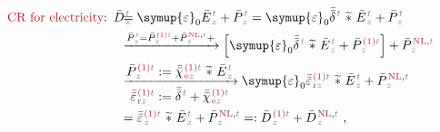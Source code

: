 \begin{subequations} \label{eq:cr-d}
\begin{align}
	\textcolor{Maroon}{\text{CR for electricity}}\text{:}&\hspace{0.5em} \bar{D}^{\;\!\textcolor{gray}{t}}_{\;\!\textcolor{gray}{z}} \hspace{-2.0em} &&= {\symup{\varepsilon}}_0 \bar{E}^{\;\!\textcolor{gray}{t}}_{\;\!\textcolor{gray}{z}} + \bar{P}^{\;\!\textcolor{gray}{t}}_{\;\!\textcolor{gray}{z}} = {\symup{\varepsilon}}_0 \bar{\bar{\delta}}^{\;\!\textcolor{gray}{t}}~\widetilde *~\bar{E}^{\;\!\textcolor{gray}{t}}_{\;\!\textcolor{gray}{z}} + \bar{P}^{\;\!\textcolor{gray}{t}}_{\;\!\textcolor{gray}{z}} \label{cr-d1} \\ & &&\xrightarrow[]{\bar{P}^{\;\!\textcolor{gray}{t}}_{\;\!\textcolor{gray}{z}} = \bar{P}^{\;\!\textcolor{Maroon}{\text{(1)}} \textcolor{gray}{t}}_{\;\!\textcolor{gray}{z}} + \bar{P}^{\;\!\textcolor{Maroon}{\text{NL}}, \textcolor{gray}{t}}_{\;\!\textcolor{gray}{z}} + } \left[ {\symup{\varepsilon}}_0 \bar{\bar{\delta}}^{\;\!\textcolor{gray}{t}}~\widetilde *~\bar{E}^{\;\!\textcolor{gray}{t}}_{\;\!\textcolor{gray}{z}} + \bar{P}^{\;\!\textcolor{Maroon}{\text{(1)}} \textcolor{gray}{t}}_{\;\!\textcolor{gray}{z}} \right] + \bar{P}^{\;\!\textcolor{Maroon}{\text{NL}}, \textcolor{gray}{t}}_{\;\!\textcolor{gray}{z}} \label{cr-d2} \\ & &&\xrightarrow[\displaystyle{ \bar{\bar{\varepsilon}}^{\;\!\textcolor{Maroon}{\text{(1)}} \textcolor{gray}{t}}_{\;\!\textcolor{Maroon}{\text{r}}\textcolor{gray}{z}} := \bar{\bar{\delta}}^{\;\!\textcolor{gray}{t}} + \bar{\bar{\chi}}^{\;\!\textcolor{Maroon}{\text{(1)}}\textcolor{gray}{t}}_{\;\!\textcolor{Maroon}{\text{e}} \textcolor{gray}{z}}}]{\displaystyle{\bar{P}^{\;\!\textcolor{Maroon}{\text{(1)}} \textcolor{gray}{t}}_{\;\!\textcolor{gray}{z}} := \bar{\bar{\chi}}^{\;\!\textcolor{Maroon}{\text{(1)}}\textcolor{gray}{t}}_{\;\!\textcolor{Maroon}{\text{e}} \textcolor{gray}{z}} ~\widetilde *~\bar{E}^{\;\!\textcolor{gray}{t}}_{\;\!\textcolor{gray}{z}}}} {\symup{\varepsilon}}_0 \bar{\bar{\varepsilon}}^{\;\!\textcolor{Maroon}{\text{(1)}} \textcolor{gray}{t}}_{\;\!\textcolor{Maroon}{\text{r}}\textcolor{gray}{z}}~\widetilde *~\bar{E}^{\;\!\textcolor{gray}{t}}_{\;\!\textcolor{gray}{z}} + \bar{P}^{\;\!\textcolor{Maroon}{\text{NL}}, \textcolor{gray}{t}}_{\;\!\textcolor{gray}{z}} \label{cr-d3} \\ & &&= \bar{\bar{\varepsilon}}^{\;\!\textcolor{Maroon}{\text{(1)}} \textcolor{gray}{t}}_{\;\!\textcolor{gray}{z}}~\widetilde *~\bar{E}^{\;\!\textcolor{gray}{t}}_{\;\!\textcolor{gray}{z}} + \bar{P}^{\;\!\textcolor{Maroon}{\text{NL}}, \textcolor{gray}{t}}_{\;\!\textcolor{gray}{z}} =: \bar{D}^{\;\!\textcolor{Maroon}{\text{(1)}} \textcolor{gray}{t}}_{\;\!\textcolor{gray}{z}} + \bar{D}^{\;\!\textcolor{Maroon}{\text{NL}}, \textcolor{gray}{t}}_{\;\!\textcolor{gray}{z}}~, \label{cr-d4}
\end{align}
\end{subequations}



